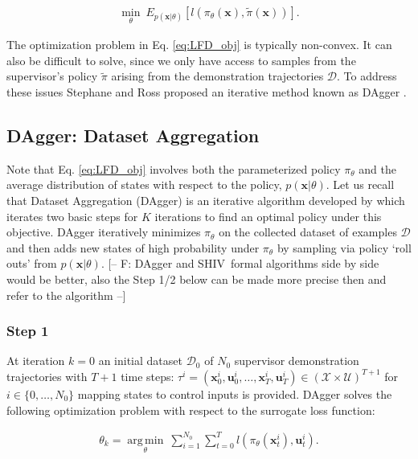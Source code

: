 \documentclass[10pt, conference]{ieeeconf}      %
\DeclareMathOperator*{\argmin}{arg\,min}
\newcommand{\bu}{\mathbf{u}}
\newcommand{\bx}{\mathbf{x}}
\newcommand{\acro}{SHIV}
\begin{document}
 \vspace{-2ex}
\begin{align}\label{eq:LFD_obj}
\underset{\theta}{\min} \: E_{p(\bx|\theta)} [l(\pi_\theta(\bx),\tilde{\pi}(\bx))].
\end{align}
 
The optimization problem in Eq. \ref{eq:LFD_obj} is  typically non-convex. It can also be difficult to solve, since we only have access to samples from the supervisor's policy $\tilde{\pi}$ arising from the demonstration trajectories $\mathcal{D}$. To address these issues Stephane and Ross proposed an iterative method known as DAgger \cite{ross2010reduction}.

 \subsection{DAgger: Dataset Aggregation}
Note that Eq. \ref{eq:LFD_obj} involves both the parameterized policy $\pi_{\theta}$ and the average distribution of
states with respect to the policy, $p(\bx|\theta)$. Let us recall that Dataset Aggregation (DAgger) is an iterative algorithm developed by \cite{ross2010reduction} which iterates two basic steps for $K$ iterations to find an optimal policy under this objective. 
DAgger iteratively minimizes $\pi_{\theta}$ on the collected dataset of examples $\mathcal{D}$ and then adds new states
of high probability under $\pi_\theta$ by sampling via policy `roll outs' from $p(\bx|\theta)$. 
{\color{blue} [-- F: DAgger and \acro~formal algorithms side by side would be better, also the Step 1/2 below can be
made more precise then and refer to the algorithm --]}

\subsubsection{Step 1}
At iteration $k=0$ an initial dataset $\mathcal{D}_0$ of $N_0$ supervisor demonstration trajectories 
with $T+1$ time steps: $\tau^i=(\bx_0^i, \bu_0^i, \ldots, \bx_T^i, \bu_T^i)\in (\mathcal{X}\times\mathcal{U})^{T+1}$ for $i\in \{0, \ldots, N_0\}$
mapping states to control
inputs is provided. DAgger solves the following optimization problem with respect to the surrogate loss function:

 \vspace{-2ex}
\begin{align}\label{eq:super_objj}
\theta_{k} = \underset{\theta}{\argmin} \: \sum_{i=1}^{N_0}\sum_{t=0}^T l(\pi_{\theta}(\bx_t^{i}),\bu_{t}^i).
\end{align}
\end{document}
